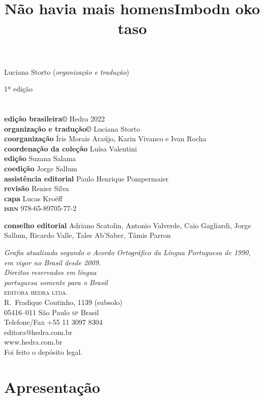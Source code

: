 \title{Não havia mais homens}

\title{Imbodn oko taso}

Luciana Storto (\textit{organização e tradução})

1ª edição

\chapter{}

\textbf{edição brasileira©} Hedra 2022\\
\textbf{organização e tradução©} Luciana Storto\\
\textbf{coorganização}				 	 Íris Morais Araújo, Karin Vivanco e Ivan Rocha\\

\textbf{coordenação da coleção} Luísa Valentini\\
\textbf{edição} Suzana Salama\\
\textbf{coedição} Jorge Sallum\\
\textbf{assistência editorial} Paulo Henrique Pompermaier\\
\textbf{revisão} Renier Silva\\
\textbf{capa} Lucas Kroëff\\

\textbf{\textsc{isbn}} 978-65-89705-77-2

\textbf{conselho editorial} Adriano Scatolin, Antonio Valverde, Caio Gagliardi, Jorge Sallum, Ricardo Valle, Tales Ab'Saber, Tâmis Parron

\bigskip
\textit{Grafia atualizada segundo o Acordo Ortográfico da Língua
Portuguesa de 1990, em vigor no Brasil desde 2009.}\\

\vfill
\textit{Direitos reservados em língua\\ 
portuguesa somente para o Brasil}\\

\textsc{editora hedra ltda.}\\
R.~Fradique Coutinho, 1139 (subsolo)\\
05416--011 São Paulo \textsc{sp} Brasil\\
Telefone/Fax +55 11 3097 8304\\\smallskip
editora@hedra.com.br\\
www.hedra.com.br\\

Foi feito o depósito legal.

\chapter{Apresentação}

